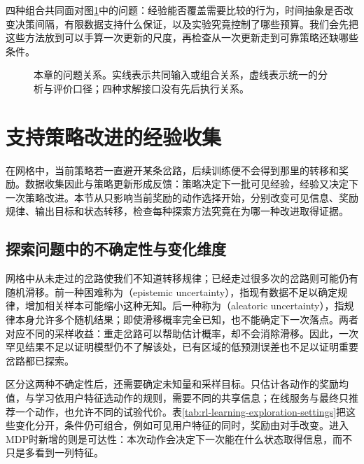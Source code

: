 四种组合共同面对图\ref{fig:rl-learning-map}中的问题：经验能否覆盖需要比较的行为，时间抽象是否改变决策间隔，有限数据支持什么保证，以及实验究竟控制了哪些预算。我们会先把这些方法放到可以手算一次更新的尺度，再检查从一次更新走到可靠策略还缺哪些条件。

\begin{figure}[htbp]
  \centering
  
  \caption{本章的问题关系。实线表示共同输入或组合关系，虚线表示统一的分析与评价口径；四种求解接口没有先后执行关系。}
  \label{fig:rl-learning-map}
\end{figure}

\section{支持策略改进的经验收集}
\label{sec:rl-learning-experience}

在网格中，当前策略若一直避开某条岔路，后续训练便不会得到那里的转移和奖励。数据收集因此与策略更新形成反馈：策略决定下一批可见经验，经验又决定下一次策略改进。本节从只影响当前奖励的动作选择开始，分别改变可见信息、奖励规律、输出目标和状态转移，检查每种探索方法究竟在为哪一种改进取得证据。

\subsection{探索问题中的不确定性与变化维度}
\label{sec:rl-learning-uncertainty}

网格中从未走过的岔路使我们不知道转移规律；已经走过很多次的岔路则可能仍有随机滑移。前一种困难称为（epistemic uncertainty），指现有数据不足以确定规律，增加相关样本可能缩小这种无知。后一种称为（aleatoric uncertainty），指规律本身允许多个随机结果；即使滑移概率完全已知，也不能确定下一次落点。两者对应不同的采样收益：重走岔路可以帮助估计概率，却不会消除滑移。因此，一次罕见结果不足以证明模型仍不了解该处，已有区域的低预测误差也不足以证明重要岔路都已探索。

区分这两种不确定性后，还需要确定未知量和采样目标。只估计各动作的奖励均值，与学习依用户特征选动作的规则，需要不同的共享信息；在线服务与最终只推荐一个动作，也允许不同的试验代价。表\ref{tab:rl-learning-exploration-settings}把这些变化分开，条件仍可组合，例如可见用户特征的同时，奖励由对手改变。进入MDP时新增的则是可达性：本次动作会决定下一次能在什么状态取得信息，而不只是多看到一列特征。

